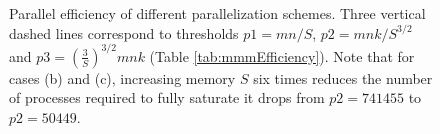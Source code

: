 \documentclass[sigplan,review,anonymous]{acmart}\settopmatter{printfolios=true,printccs=false,printacmref=false}
\begin{document}
\begin{figure}[t]
	\centering
	\hspace{-1cm}
	\hspace*{-1.5cm}
	\caption{Parallel 
		efficiency 
		of different parallelization schemes. Three vertical 
		dashed lines 
		correspond to 
		thresholds 
		$p1 = mn/S$, $p2 = mnk/S^{3/2}$ and $p3 = 
		(\frac{3}{S})^{3/2}mnk$ (Table 
		\ref{tab:mmmEfficiency}). Note 
		that for cases (b) and (c), increasing memory $S$ six 
		times 
		reduces the number of processes required to fully 
		saturate it 
		drops from $p2=741455$ to $p2=50449$. }
	\label{fig:mmmScaling}
\end{figure}
\end{document}
